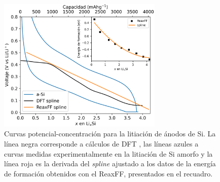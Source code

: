 \begin{figure}[h!]
    \centering
    \includegraphics[width=0.7\textwidth]{Silicio/caracterizacion/resultados/electroquimica/voltaje.png}
    \caption{Curvas potencial-concentración para la litiación de ánodos de Si.
    La línea negra corresponde a cálculos de DFT \cite{chevrier2009}, las líneas azules a 
    curvas medidas experimentalmente en la litiación de Si amorfo \cite{hatchard2004} y la línea 
    roja es la derivada del \textit{spline} ajustado a los datos de la energía 
    de formación obtenidos con el ReaxFF, presentados en el recuadro.}
    \label{fig:voltaje}
\end{figure}
